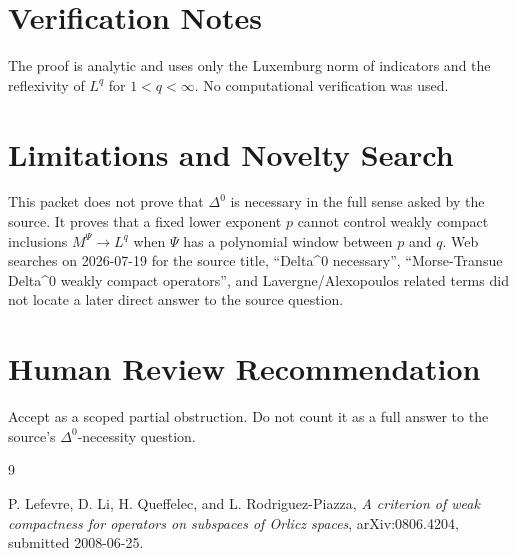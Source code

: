 \documentclass[11pt]{article}
\begin{document}
\section*{Verification Notes}

The proof is analytic and uses only the Luxemburg norm of indicators and the
reflexivity of \(L^q\) for \(1<q<\infty\). No computational verification was
used.

\section*{Limitations and Novelty Search}

This packet does not prove that \(\Delta^0\) is necessary in the full sense
asked by the source. It proves that a fixed lower exponent \(p\) cannot control
weakly compact inclusions \(M^\Psi\to L^q\) when \(\Psi\) has a polynomial window
between \(p\) and \(q\). Web searches on 2026-07-19 for the source title,
``Delta\^{}0 necessary'', ``Morse-Transue Delta\^{}0 weakly compact operators'',
and Lavergne/Alexopoulos related terms did not locate a later direct answer to
the source question.

\section*{Human Review Recommendation}

Accept as a scoped partial obstruction. Do not count it as a full answer to the
source's \(\Delta^0\)-necessity question.

\begin{thebibliography}{9}

P. Lefevre, D. Li, H. Queffelec, and L. Rodriguez-Piazza,
\emph{A criterion of weak compactness for operators on subspaces of Orlicz spaces},
arXiv:0806.4204, submitted 2008-06-25.

\end{thebibliography}
\end{document}
